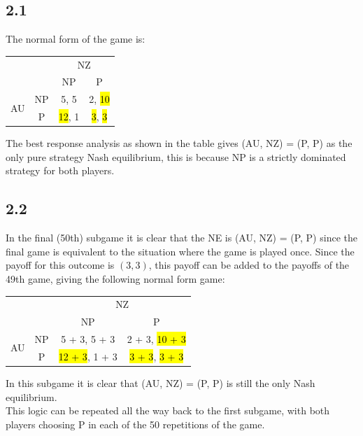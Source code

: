 \documentclass{article}
\begin{document}
\subsection*{2.1}
The normal form of the game is:
\begin{table}[H]
    \centering
    \begin{tabular}{@{}cccc@{}}
                                             &                         & \multicolumn{2}{c}{NZ}                                  \\ \cmidrule(l){3-4} 
                                             & \multicolumn{1}{c|}{}   & \multicolumn{1}{c|}{NP}    & \multicolumn{1}{c|}{P}     \\ \cmidrule(l){2-4} 
    \multicolumn{1}{c|}{\multirow{2}{*}{AU}} & \multicolumn{1}{c|}{NP} & \multicolumn{1}{c|}{5, 5}  & \multicolumn{1}{c|}{2, \hl{10}} \\ \cmidrule(l){2-4} 
    \multicolumn{1}{c|}{}                    & \multicolumn{1}{c|}{P}  & \multicolumn{1}{c|}{\hl{12}, 1} & \multicolumn{1}{c|}{\hl{3}, \hl{3}}  \\ \cmidrule(l){2-4} 
    \end{tabular}
\end{table}
\noindent The best response analysis as shown in the table gives (AU, NZ) = (P, P) as the only pure strategy Nash equilibrium, this is because NP is a strictly dominated strategy for both players.

\subsection*{2.2}
In the final (50th) subgame it is clear that the NE is (AU, NZ) = (P, P) since the final game is equivalent to the situation where the game is played once. Since the payoff for this outcome is $(3, 3)$, this payoff can be added to the payoffs of the 49th game, giving the following normal form game:
\begin{table}[H]
    \centering
    \begin{tabular}{@{}cccc@{}}
                                             &                         & \multicolumn{2}{c}{NZ}                                  \\ \cmidrule(l){3-4} 
                                             & \multicolumn{1}{c|}{}   & \multicolumn{1}{c|}{NP}    & \multicolumn{1}{c|}{P}     \\ \cmidrule(l){2-4} 
    \multicolumn{1}{c|}{\multirow{2}{*}{AU}} & \multicolumn{1}{c|}{NP} & \multicolumn{1}{c|}{5 + 3, 5 + 3}  & \multicolumn{1}{c|}{2 + 3, \hl{10 + 3}} \\ \cmidrule(l){2-4} 
    \multicolumn{1}{c|}{}                    & \multicolumn{1}{c|}{P}  & \multicolumn{1}{c|}{\hl{12 + 3}, 1 + 3} & \multicolumn{1}{c|}{\hl{3 + 3}, \hl{3 + 3}}  \\ \cmidrule(l){2-4} 
    \end{tabular}
\end{table}
\noindent In this subgame it is clear that (AU, NZ) = (P, P) is still the only Nash equilibrium.\\[2mm]
This logic can be repeated all the way back to the first subgame, with both players choosing P in each of the 50 repetitions of the game.
\end{document}

